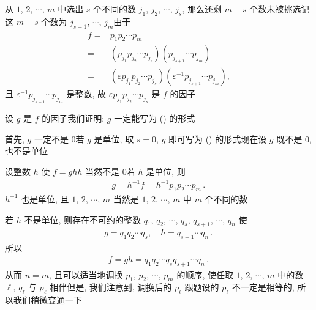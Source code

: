 \begin{pf}
    从 $1$, $2$, $\cdots$, $m$ 中选出 $s$ 个不同的数 $j_1$, $j_2$, $\cdots$, $j_s$, 那么还剩 $m-s$ 个数未被挑选\period 记这 $m-s$ 个数为 $j_{s+1}$, $\cdots$, $j_m$\period 由于
    \begin{align*}
        f
        = {} & p_1 p_2 \cdots p_m                                                                          \\
        = {} & (p_{j_1} p_{j_2} \cdots p_{j_s}) (p_{j_{s+1}} \cdots p_{j_m})                               \\
        = {} & (\varepsilon p_{j_1} p_{j_2} \cdots p_{j_s}) (\varepsilon^{-1} p_{j_{s+1}} \cdots p_{j_m}),
    \end{align*}
    且 $\varepsilon^{-1} p_{j_{s+1}} \cdots p_{j_m}$ 是整数, 故 $\varepsilon p_{j_1} p_{j_2} \cdots p_{j_s}$ 是 $f$ 的因子\period

    设 $g$ 是 $f$ 的因子\period 我们证明: $g$ 一定能写为 (\myStar) 的形式\period

    首先, $g$ 一定不是 $0$\period 若 $g$ 是单位, 取 $s = 0$, $g$ 即可写为 (\myStar) 的形式\period 现在设 $g$ 既不是 $0$, 也不是单位\period

    设整数 $h$ 使 $f = gh$\period $h$ 当然不是 $0$\period 若 $h$ 是单位, 则
    \begin{align*}
        g = h^{-1} f = h^{-1} p_1 p_2 \cdots p_m \period
    \end{align*}
    $h^{-1}$ 也是单位, 且 $1$, $2$, $\cdots$, $m$ 当然是 $1$, $2$, $\cdots$, $m$ 中 $m$ 个不同的数\period

    若 $h$ 不是单位, 则存在不可约的整数 $q_1$, $q_2$, $\cdots$, $q_s$, $q_{s+1}$, $\cdots$, $q_n$ 使
    \begin{align*}
        g = q_1 q_2 \cdots q_s, \quad h = q_{s+1} \cdots q_n \period
    \end{align*}
    所以
    \begin{align*}
        f = gh = q_1 q_2 \cdots q_s q_{s+1} \cdots q_n \period
    \end{align*}
    从而 $n = m$, 且可以适当地调换 $p_1$, $p_2$, $\cdots$, $p_m$ 的顺序, 使任取 $1$, $2$, $\cdots$, $m$ 中的数 $\ell$, $q_\ell$ 与 $p_\ell$ 相伴\period 但是, 我们注意到, 调换后的 $p_{\ell}$ 跟题设的 $p_{\ell}$ 不一定是相等的, 所以我们稍微变通一下\period


\end{pf}
